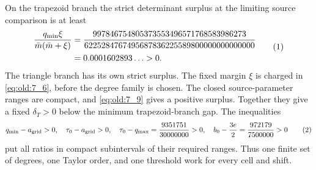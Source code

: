 On the trapezoid branch the strict determinant surplus
at the limiting source comparison is at least
\[
\begin{aligned}
 \frac{q_{\min}\xi}{\bar m(\bar m+\xi)}
 &=\frac{997846754805373553496571768583986273}
         {6225284767495687836225589800000000000000}\\
 &=0.0001602893\ldots>0.
\end{aligned}
\AutoTag{eq:old:7_9}
\]
The triangle branch has its own strict surplus. The fixed margin \(\xi\)
is charged in \eqref{eq:old:7_6}, before the degree family is chosen. The
closed source-parameter ranges are compact, and \eqref{eq:old:7_9} gives a
positive surplus. Together they give a fixed \(\delta_T>0\) below the
minimum trapezoid-branch gap. The inequalities
\[
 q_{\min}-a_{\rm grid}>0,\quad \tau_0-a_{\rm grid}>0,\quad
 \tau_0-q_{\max}=\frac{9351751}{30000000}>0,\quad
 b_0-\frac{3e}{2}=\frac{972179}{7500000}>0
\AutoTag{eq:old:7_10}
\]
put all ratios in compact subintervals of their required ranges. Thus one
finite set of degrees, one Taylor order, and one threshold work for every
cell and shift.

